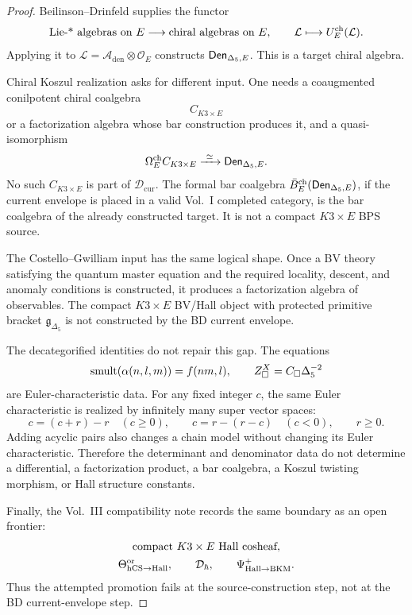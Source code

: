 \begin{proof}
Beilinson--Drinfeld supplies the functor
$$
\hbox{Lie-* algebras on }E
\longrightarrow
\hbox{chiral algebras on }E,
\qquad
\mathcal L\longmapsto U_E^{\mathrm{ch}}(\mathcal L).
$$
Applying it to
\(\mathcal L=\mathcal A_{\mathrm{den}}\otimes\mathcal O_E\) constructs
\(\mathsf{Den}_{\Delta_5,E}\).  This is a target chiral algebra.

Chiral Koszul realization asks for different input.  One needs a
coaugmented conilpotent chiral coalgebra
\[
C_{K3\times E}
\]
or a factorization algebra whose bar construction produces it, and a
quasi-isomorphism
$$
\Omega^{\mathrm{ch}}_E C_{K3\times E}
\xrightarrow{\ \simeq\ }
\mathsf{Den}_{\Delta_5,E}.
$$
No such \(C_{K3\times E}\) is part of \(\mathcal D_{\mathrm{cur}}\).
The formal bar coalgebra
\(\bar B_E^{\mathrm{ch}}(\mathsf{Den}_{\Delta_5,E})\), if the current envelope is
placed in a valid Vol.~I completed category, is the bar coalgebra of the
already constructed target.  It is not a compact \(K3\times E\) BPS
source.

The Costello--Gwilliam input has the same logical shape.  Once a BV
theory satisfying the quantum master equation and the required locality,
descent, and anomaly conditions is constructed, it produces a
factorization algebra of observables.  The compact
\(K3\times E\) BV/Hall object with protected primitive bracket
\(\mathfrak g_{\Delta_5}\) is not constructed by the BD current envelope.

The decategorified identities do not repair this gap.  The equations
$$
\operatorname{smult}(\alpha(n,l,m))=f(nm,l),
\qquad
Z^X_{\square}=C_{\square}\Delta_5^{-2}
$$
are Euler-characteristic data.  For any fixed integer \(c\), the same
Euler characteristic is realized by infinitely many super vector spaces:
$$
c=(c+r)-r\quad(c\geq0),\qquad
c=r-(r-c)\quad(c<0),\qquad r\geq0.
$$
Adding acyclic pairs also changes a chain model without changing its
Euler characteristic.  Therefore the determinant and denominator data do
not determine a differential, a factorization product, a bar coalgebra, a
Koszul twisting morphism, or Hall structure constants.

Finally, the Vol.~III compatibility note records the same boundary as an
open frontier:
$$
\begin{gathered}
\text{compact}\ K3\times E\ \text{Hall cosheaf},\\
\Theta_{\mathrm{hCS}\to\mathrm{Hall}}^{\mathrm{or}},\qquad
\mathcal D_\hbar,\qquad
\Psi^+_{\mathrm{Hall}\to\mathrm{BKM}}.
\end{gathered}
$$
Thus the attempted promotion fails at the source-construction step, not
at the BD current-envelope step.
\end{proof}

